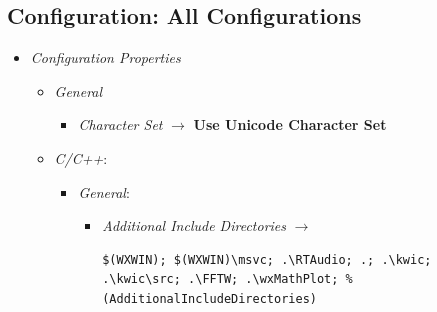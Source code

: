 \documentclass[12pt]{report}
\begin{document}
\begin{appendices}
	\section{Configuration: All Configurations}
	\label{app:all}
	\begin{itemize} %
		\item \emph{Configuration Properties}
		\begin{itemize} %
			\item \emph{General}
			\begin{itemize} %
				\item \emph{Character Set} $\rightarrow$ {\bf Use Unicode Character Set}
			\end{itemize} %
			\item \emph{C/C++}:
			\begin{itemize} %
				\item \emph{General}:
				\begin{itemize} %
					\item \emph{Additional Include Directories} $\rightarrow$
\begin{lstlisting}
$(WXWIN); $(WXWIN)\msvc; .\RTAudio; .; .\kwic; .\kwic\src; .\FFTW; .\wxMathPlot; %(AdditionalIncludeDirectories)
\end{lstlisting}
				\end{itemize} %


\end{itemize}
\end{itemize}
\end{itemize}
\end{appendices}
\end{document}
